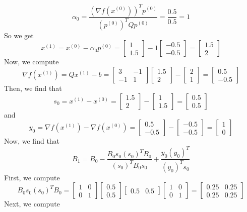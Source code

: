 \documentclass[12pt]{article}
\begin{document}
\[
\alpha_0 = \frac{(\nabla f(x^{(0)}))^T p^{(0)}}{(p^{(0)})^T Q p^{(0)}} = \frac{0.5}{0.5} = 1
\] So we get
\[
x^{(1)} = x^{(0)} - \alpha_0 p^{(0)} = \begin{bmatrix}
1\\
1.5
\end{bmatrix} - 1 \begin{bmatrix}
-0.5\\
-0.5
\end{bmatrix} = \begin{bmatrix}
1.5\\
2
\end{bmatrix}
\] Now, we compute
\[
\nabla f(x^{(1)}) = Qx^{(1)} - b = \begin{bmatrix}
3 & -1\\
-1 & 1
\end{bmatrix}
\begin{bmatrix}
1.5\\
2
\end{bmatrix} - 
\begin{bmatrix}
2\\
1
\end{bmatrix} = 
\begin{bmatrix}
0.5\\
-0.5
\end{bmatrix}
\] Then, we find that
\[
s_0 = x^{(1)} - x^{(0)} =  \begin{bmatrix}
1.5\\
2
\end{bmatrix}  - \begin{bmatrix}
1\\
1.5
\end{bmatrix} =
 \begin{bmatrix}
0.5\\
0.5
\end{bmatrix}
 \]
 and
\[
y_0 = \nabla f(x^{(1)}) - \nabla f(x^{(0)}) = 
\begin{bmatrix}
0.5\\
-0.5
\end{bmatrix} - \begin{bmatrix}
-0.5\\
-0.5
\end{bmatrix} = 
\begin{bmatrix}
1\\
0
\end{bmatrix}
\] Now, we find that
\[
B_1 = B_0 - \frac{B_0 s_0 (s_0)^T B_0}{(s_0)^T B_0 s_0} + \frac{y_0 (y_0)^T}{(y_0)^T s_0}
\] First, we compute
\[
B_0 s_0 (s_0)^T B_0 = 
\begin{bmatrix}
1 & 0\\
0 & 1 
\end{bmatrix}
\begin{bmatrix}
0.5\\
0.5 
\end{bmatrix}
\begin{bmatrix}
0.5 & 0.5 
\end{bmatrix}
\begin{bmatrix}
1 & 0\\
0 & 1 
\end{bmatrix} =
\begin{bmatrix}
0.25 & 0.25\\
0.25 & 0.25 
\end{bmatrix} 
\] Next, we compute
\end{document}
